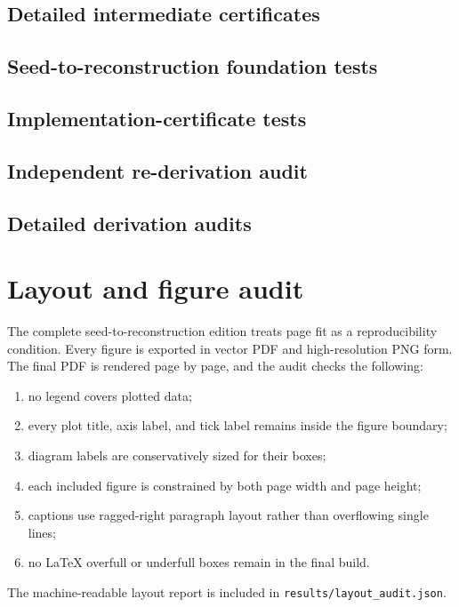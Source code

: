 \documentclass[11pt,oneside]{book}
\theoremstyle{definition}
\theoremstyle{remark}
\begin{document}
\section{Detailed intermediate certificates}


\section{Seed-to-reconstruction foundation tests}


\section{Implementation-certificate tests}


\section{Independent re-derivation audit}


\section{Detailed derivation audits}


\chapter{Layout and figure audit}
The complete seed-to-reconstruction edition treats page fit as a reproducibility condition. Every figure is exported in vector PDF and high-resolution PNG form. The final PDF is rendered page by page, and the audit checks the following:
\begin{enumerate}[label=(\roman*)]
\item no legend covers plotted data;
\item every plot title, axis label, and tick label remains inside the figure boundary;
\item diagram labels are conservatively sized for their boxes;
\item each included figure is constrained by both page width and page height;
\item captions use ragged-right paragraph layout rather than overflowing single lines;
\item no LaTeX overfull or underfull boxes remain in the final build.
\end{enumerate}
The machine-readable layout report is included in \texttt{results/layout\_audit.json}.
\end{document}
